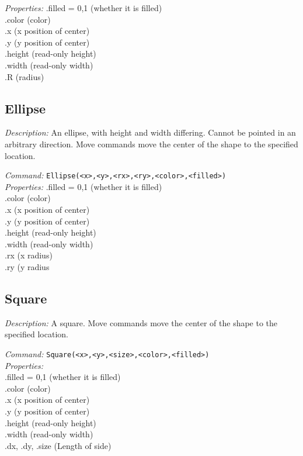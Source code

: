 \emph{Properties:}
.filled = {0,1} (whether it is filled)\\
.color (color) \\
.x  (x position of center) \\
.y  (y position of center)\\
.height (read-only height)\\
.width (read-only width)\\
.R  (radius)\\

\subsection{Ellipse}

\emph{Description:} An ellipse, with height and width differing.
  Cannot be pointed in an arbitrary direction.  Move commands move the center
  of the shape to the specified location.

\emph{Command:}  \verb+Ellipse(<x>,<y>,<rx>,<ry>,<color>,<filled>)+\\

\emph{Properties:}
.filled = {0,1} (whether it is filled)\\
.color (color) \\
.x  (x position of center) \\
.y  (y position of center)\\
.height (read-only height)\\
.width (read-only width)\\
.rx  (x radius)\\
.ry  (y radius


\subsection{Square}

\emph{Description:} A square. Move commands move the center
  of the shape to the specified location.

\emph{Command:}  \verb+Square(<x>,<y>,<size>,<color>,<filled>)+\\

\emph{Properties:}\\
.filled = 0,1 (whether it is filled)\\
.color (color) \\
.x  (x position of center) \\
.y  (y position of center)\\
.height (read-only height)\\
.width (read-only width)\\
.dx, .dy, .size  (Length of side)\\


